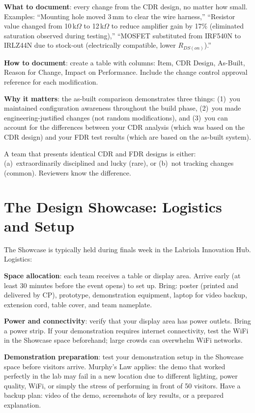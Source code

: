 \textbf{What to document}: every change from the CDR design, no matter how small. Examples: ``Mounting hole moved 3\,mm to clear the wire harness,'' ``Resistor value changed from 10\,k$\Omega$ to 12\,k$\Omega$ to reduce amplifier gain by 17\% (eliminated saturation observed during testing),'' ``MOSFET substituted from IRF540N to IRLZ44N due to stock-out (electrically compatible, lower $R_{DS(on)}$).''

\textbf{How to document}: create a table with columns: Item, CDR Design, As-Built, Reason for Change, Impact on Performance. Include the change control approval reference for each modification.

\textbf{Why it matters}: the as-built comparison demonstrates three things: (1)~you maintained configuration awareness throughout the build phase, (2)~you made engineering-justified changes (not random modifications), and (3)~you can account for the differences between your CDR analysis (which was based on the CDR design) and your FDR test results (which are based on the as-built system).

A team that presents identical CDR and FDR designs is either: (a)~extraordinarily disciplined and lucky (rare), or (b)~not tracking changes (common). Reviewers know the difference.

\section{The Design Showcase: Logistics and Setup}
The Showcase is typically held during finals week in the Labriola Innovation Hub. Logistics:

\textbf{Space allocation}: each team receives a table or display area. Arrive early (at least 30 minutes before the event opens) to set up. Bring: poster (printed and delivered by CP), prototype, demonstration equipment, laptop for video backup, extension cord, table cover, and team nameplate.

\textbf{Power and connectivity}: verify that your display area has power outlets. Bring a power strip. If your demonstration requires internet connectivity, test the WiFi in the Showcase space beforehand; large crowds can overwhelm WiFi networks.

\textbf{Demonstration preparation}: test your demonstration setup in the Showcase space before visitors arrive. Murphy's Law applies: the demo that worked perfectly in the lab may fail in a new location due to different lighting, power quality, WiFi, or simply the stress of performing in front of 50 visitors. Have a backup plan: video of the demo, screenshots of key results, or a prepared explanation.

